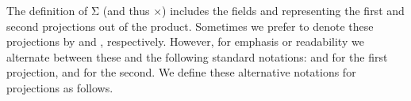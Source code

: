The definition of \ar Σ (and thus \af ×) includes the fields   and  representing the first and second projections out of the product.  Sometimes we prefer to denote these projections by  and , respectively. However, for emphasis or readability we alternate between these and the following standard notations:  and  for the first projection,  and  for the second.  We define these alternative notations for projections as follows.
\ccpad
\begin{code}%
\>[0]\AgdaSpace{}%
\AgdaModule{\AgdaUnderscore{}}\AgdaSpace{}%
\AgdaSymbol{\{}\AgdaSpace{}%
\AgdaSymbol{:}\AgdaSpace{}%
\AgdaSymbol{\}\{}\AgdaSpace{}%
\AgdaSymbol{:}\AgdaSpace{}%
\AgdaSpace{}%
\AgdaSpace{}%
\AgdaSymbol{\}\{}\AgdaSpace{}%
\AgdaSymbol{:}\AgdaSpace{}%
\AgdaSpace{}%
\AgdaSpace{}%
\AgdaSpace{}%
\AgdaSymbol{\}}\AgdaSpace{}%
\<%
\\
%
\\[\AgdaEmptyExtraSkip]%
\>[0][@{}l@{\AgdaIndent{0}}]%
\>[1]\AgdaSpace{}%
\AgdaSpace{}%
\AgdaSymbol{:}\AgdaSpace{}%
\AgdaSpace{}%
\AgdaSpace{}%
\AgdaSpace{}%
\<%
\\
%
\>[1]\AgdaSpace{}%
\AgdaSpace{}%
\AgdaOperator{\AgdaInductiveConstructor{,}}\AgdaSpace{}%
\AgdaSpace{}%
\AgdaSpace{}%
\AgdaSymbol{=}\AgdaSpace{}%
\<%
\\
%
\>[1]\AgdaSpace{}%
\AgdaSymbol{(}\AgdaSpace{}%
\AgdaOperator{\AgdaInductiveConstructor{,}}\AgdaSpace{}%
\AgdaSymbol{)}\AgdaSpace{}%
\AgdaSymbol{=}\AgdaSpace{}%
\<%
\\
%
\\[\AgdaEmptyExtraSkip]%
%
\>[1]\AgdaSpace{}%
\AgdaSpace{}%

\end{code}
